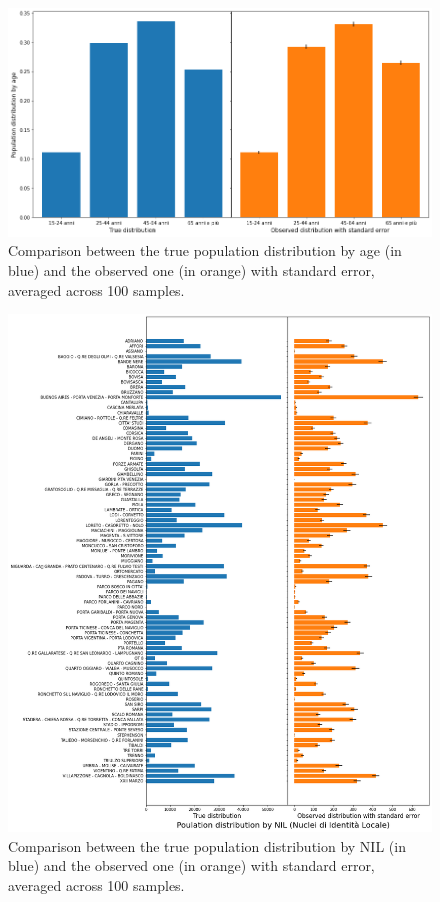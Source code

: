 \begin{figure}
    \centering
    \includegraphics[scale = 0.5]{tex/pics/pop_by_age.png}
    \caption{Comparison between the true population distribution by age (in blue) and the observed one (in orange) with standard error, averaged across 100 samples.}
    \label{pop_age}
\end{figure}

\begin{figure}
    \centering
    \includegraphics[scale = 0.45]{tex/pics/pop_by_nil_tot.png}
    \caption{Comparison between the true population distribution by NIL (in blue) and the observed one (in orange) with standard error, averaged across 100 samples.}
    \label{pop_nil_tot}
\end{figure}



